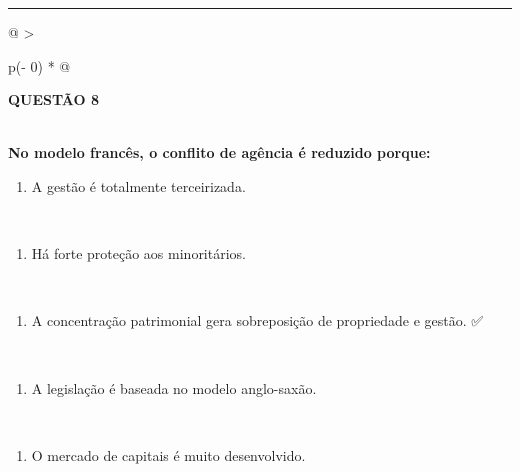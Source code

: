 \documentclass[
]{book}
\providecommand{\tightlist}{%
  \setlength{\itemsep}{0pt}\setlength{\parskip}{0pt}}
\begin{document}
\begin{center}\rule{0.5\linewidth}{0.5pt}\end{center}

\begin{longtable}[]{@{}
  >{\raggedright\arraybackslash}p{(\columnwidth - 0\tabcolsep) * }@{}}
\toprule\noalign{}
\begin{minipage}[b]{\linewidth}\raggedright
\textbf{QUESTÃO 8}
\end{minipage} \\
\midrule\noalign{}
\endhead
\bottomrule\noalign{}
\endlastfoot
\textbf{No modelo francês, o conflito de agência é reduzido porque:} \\
\begin{minipage}[t]{\linewidth}\raggedright
\begin{enumerate}
\def\labelenumi{\alph{enumi})}
\tightlist
\item
  A gestão é totalmente terceirizada.
\end{enumerate}
\end{minipage} \\
\begin{minipage}[t]{\linewidth}\raggedright
\begin{enumerate}
\def\labelenumi{\alph{enumi})}
\setcounter{enumi}{1}
\tightlist
\item
  Há forte proteção aos minoritários.
\end{enumerate}
\end{minipage} \\
\begin{minipage}[t]{\linewidth}\raggedright
\begin{enumerate}
\def\labelenumi{\alph{enumi})}
\setcounter{enumi}{2}
\tightlist
\item
  A concentração patrimonial gera sobreposição de propriedade e gestão. ✅
\end{enumerate}
\end{minipage} \\
\begin{minipage}[t]{\linewidth}\raggedright
\begin{enumerate}
\def\labelenumi{\alph{enumi})}
\setcounter{enumi}{3}
\tightlist
\item
  A legislação é baseada no modelo anglo-saxão.
\end{enumerate}
\end{minipage} \\
\begin{minipage}[t]{\linewidth}\raggedright
\begin{enumerate}
\def\labelenumi{\alph{enumi})}
\setcounter{enumi}{4}
\tightlist
\item
  O mercado de capitais é muito desenvolvido.
\end{enumerate}
\end{minipage} \\
 \\
\end{longtable}
\end{document}
